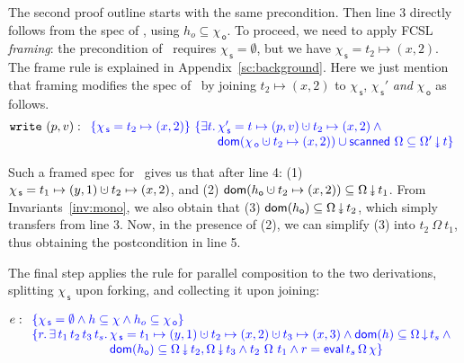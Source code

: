\documentclass[a4paper,UKenglish]{lipics-v2016}
\newcommand{\dom}[1]{\mathsf{dom}(#1)}
\newcommand{\specK}[1]{\ensuremath{\textcolor{blue}{#1}}}
\newcommand{\dotcup}{\ensuremath{\mathaccent\cdot\cup}}
\newcommand{\selfsub}{\mathsf{s}}
\newcommand{\othersub}{\mathsf{o}}
\newcommand{\hist}{\chi}
\newcommand{\histS}{\hist_{\, \selfsub}}
\newcommand{\histO}{\hist_{\, \othersub}}
\newcommand{\hempty}{\emptyset}
\newcommand{\hunion}{\mathbin{\dotcup}}
\newcommand{\hpts}{\mapsto}
\newcommand{\ldot}{\mathord{.}\,}
\newcommand{\stableorder}{\Omega}
\newcommand{\stableorderP}{\stableorder'}
\newcommand{\histSP}{\hist_{\, \selfsub}'}
\newcommand{\tsPre}[1]{\ensuremath{{\textcolor{blue}{#1}}}}
\newcommand{\tsPos}[1]{\ensuremath{\textcolor{blue}{#1}}}
\theoremstyle{definition}
\begin{document}
The second proof outline starts with the same precondition. Then line
$3$ directly follows from the spec of \jywrite, using $h_o
\subseteq \histO$. To proceed, we need to apply FCSL
\emph{framing}: the precondition of \jywrite\ requires $\histS =
\emptyset$, but we have $\histS = t_2 \mapsto (x, 2)$.
The frame rule is explained in Appendix~\ref{sc:background}.
%
Here we just mention that framing modifies the spec of \jywrite\ by
joining $t_2 \mapsto (x, 2)$ to $\histS$, $\histSP$ \emph{and}
$\histO$ as follows.
\[
\mathtt{write}\ (p, v) : 
\begin{array}[t]{l}
\tsPre{\{\histS = t_2 \mapsto (x, 2)\}}\
\tsPos{\{\exists t\ldot \histS' = t \mapsto (p, v) \hunion t_2 \mapsto (x, 2) \wedge \hbox{}}\\
\tsPos{\hphantom{\{\histS = t_2 \mapsto (x, 2)\}\ \{\exists t\ldot}
    \dom {\histO \hunion t_2 \mapsto (x, 2)} \cup \scanned\, \stableorder
       \subseteq \sideal{\stableorderP}{t}\}}
\end{array}
\]

Such a framed spec for \jywrite\ gives us that after line 4: (1)
$\histS = t_1 \hpts (y,1) \hunion t_2 \hpts (x,2)$, and (2)
$\dom{h_{\othersub} \hunion t_2 \mapsto (x, 2)} \subseteq
\sideal{\stableorder}{t_1}$. From Invariants~\ref{inv:mono}, we also
obtain that (3) $\dom{h_{\othersub}} \subseteq
\sideal{\stableorder}{t_2}$, which simply transfers from line 3. Now,
in the presence of (2), we can simplify (3) into
$t_2\ {\stableorder}\ t_1$, thus obtaining the postcondition in line
5.

The final step applies the rule for parallel composition to the two
derivations, splitting $\histS$ upon forking, and collecting it upon
joining:
%

\[
e : \begin{array}[t]{l}
    \specK{\{\histS = \hempty \wedge h \subseteq \hist \wedge h_o \subseteq \histO\}}\\
 \specK{\{r\ldot \exists\, t_1\, t_2\, t_3\, t_s \ldot 
    \histS = t_1 \hpts (y,1) \hunion t_2 \hpts (x,2) \hunion t_3 \hpts
        (x, 3) \wedge  \dom{h} \subseteq \ideal{\stableorder}{t_s} \wedge \hbox{}}\\
\specK{\hphantom{\{r\ldot \exists\, t_1\, t_2\, t_3\, t_s \ldot }
\dom{h_{\othersub}} \subseteq \sideal{\stableorder}{t_2}, \sideal{\stableorder}{t_3} \wedge 
 t_2\ {\stableorder}\ t_1 \wedge 
     r = \eval\, t_s\, \stableorder\, \hist\}}
\end{array}
\]
\end{document}

